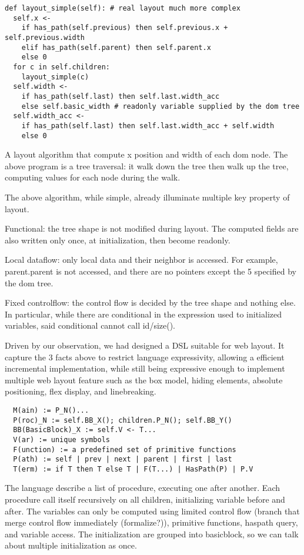 \documentclass[format=acmsmall, review=false, screen=true]{acmart}
\begin{document}
\begin{verbatim}
def layout_simple(self): # real layout much more complex
  self.x <-
    if has_path(self.previous) then self.previous.x + self.previous.width
    elif has_path(self.parent) then self.parent.x
    else 0
  for c in self.children:
    layout_simple(c)
  self.width <-
    if has_path(self.last) then self.last.width_acc 
    else self.basic_width # readonly variable supplied by the dom tree
  self.width_acc <-
    if has_path(self.last) then self.last.width_acc + self.width 
    else 0
\end{verbatim}
A layout algorithm that compute x position and width of each dom node. The above program is a tree traversal: it walk down the tree then walk up the tree, computing values for each node during the walk.

The above algorithm, while simple, already illuminate multiple key property of layout.

Functional: the tree shape is not modified during layout. The computed fields are also written only once, at initialization, then become readonly.

Local dataflow: only local data and their neighbor is accessed. For example, parent.parent is not accessed, and there are no pointers except the 5 specified by the dom tree. 

Fixed controlflow: the control flow is decided by the tree shape and nothing else. In particular, while there are conditional in the expression used to initialized variables, said conditional cannot call id/size().

Driven by our observation, we had designed a DSL suitable for web layout. It capture the 3 facts above to restrict language expressivity, allowing a efficient incremental implementation, while still being expressive enough to implement multiple web layout feature such as the box model, hiding elements, absolute positioning, flex display, and linebreaking.

\begin{verbatim}
  M(ain) := P_N()...
  P(roc)_N := self.BB_X(); children.P_N(); self.BB_Y()
  BB(BasicBlock)_X := self.V <- T... 
  V(ar) := unique symbols
  F(unction) := a predefined set of primitive functions
  P(ath) := self | prev | next | parent | first | last
  T(erm) := if T then T else T | F(T...) | HasPath(P) | P.V
\end{verbatim}

The language describe a list of procedure, executing one after another. Each procedure call itself recursively on all children, initializing variable before and after. The variables can only be computed using limited control flow (branch that merge control flow immediately (formalize?)), primitive functions, haspath query, and variable access. The initialization are grouped into basicblock, so we can talk about multiple initialization as once.
\end{document}
